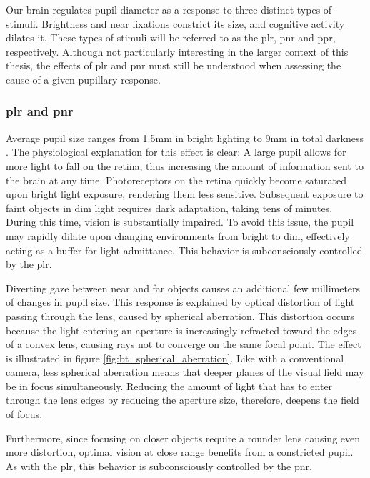 
Our brain regulates pupil diameter as a response to three distinct types of stimuli. Brightness and near fixations constrict its size, and cognitive activity dilates it. These types of stimuli will be referred to as the \acrfull{plr}, \acrfull{pnr} and \acrfull{ppr}, respectively. Although not particularly interesting in the larger context of this thesis, the effects of \acrshort{plr} and \acrshort{pnr} must still be understood when assessing the cause of a given pupillary response. 

\subsubsection{\acrfull{plr} and \acrfull{pnr}} \label{sec:bt/cognitive_impacts/plr_pnr}

Average pupil size ranges from 1.5mm in bright lighting to 9mm in total darkness \cite{eckstein2017}. The physiological explanation for this effect is clear: A large pupil allows for more light to fall on the retina, thus increasing the amount of information sent to the brain at any time. Photoreceptors on the retina quickly become saturated upon bright light exposure, rendering them less sensitive. Subsequent exposure to faint objects in dim light requires dark adaptation, taking tens of minutes. During this time, vision is substantially impaired. To avoid this issue, the pupil may rapidly dilate upon changing environments from bright to dim, effectively acting as a buffer for light admittance. This behavior is subconsciously controlled by the \acrshort{plr}.

Diverting gaze between near and far objects causes an additional few millimeters of changes in pupil size. This response is explained by optical distortion of light passing through the lens, caused by spherical aberration. This distortion occurs because the light entering an aperture is increasingly refracted toward the edges of a convex lens, causing rays not to converge on the same focal point. The effect is illustrated in figure \ref{fig:bt_spherical_aberration}. Like with a conventional camera, less spherical aberration means that deeper planes of the visual field may be in focus simultaneously. Reducing the amount of light that has to enter through the lens edges by reducing the aperture size, therefore, deepens the field of focus.

Furthermore, since focusing on closer objects require a rounder lens causing even more distortion, optimal vision at close range benefits from a constricted pupil. As with the \acrshort{plr}, this behavior is subconsciously controlled by the \acrshort{pnr}.

